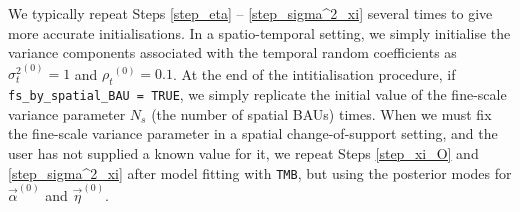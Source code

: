 \documentclass[12pt,a4paper]{article}
\begin{document}
\begin{appendices}
\begin{enumerate}
\begin{enumerate}[i.]
    \end{enumerate}
\end{enumerate}
We typically repeat Steps \ref{step_eta} -- \ref{step_sigma^2_xi} several times to give more accurate initialisations. 
In a spatio-temporal setting, we simply initialise the variance components associated with the temporal random coefficients as ${\sigma^2_t}^{(0)} = 1$ and ${\rho_t}^{(0)} = 0.1$.
At the end of the intitialisation procedure, if \texttt{fs\_by\_spatial\_BAU = TRUE}, we simply replicate the initial value of the fine-scale variance parameter $N_s$ (the number of spatial BAUs) times. 
 When we must fix the fine-scale variance parameter in a spatial change-of-support setting, and the user has not supplied a known value for it, we repeat 
 Steps \ref{step_xi_O} and \ref{step_sigma^2_xi} after model fitting with \texttt{TMB}, but using the posterior modes for $\vec{\alpha}^{(0)}$ and $\vec{\eta}^{(0)}$. 




\end{appendices}
\end{document}
